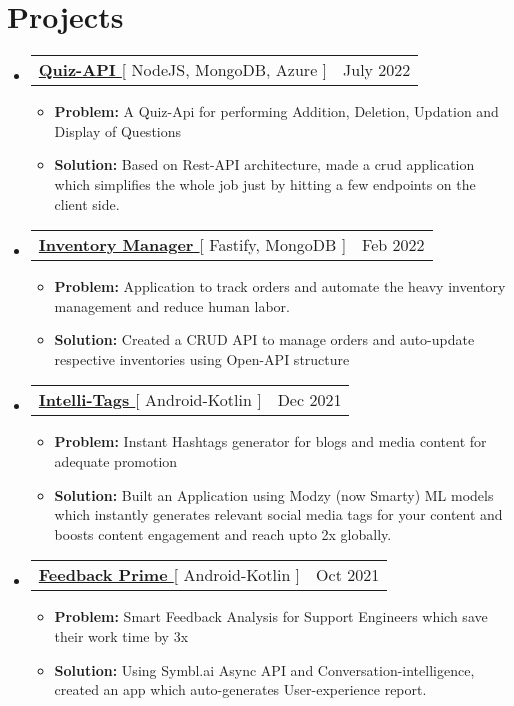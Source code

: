 \documentclass[letterpaper,11pt]{article}
\makeatletter
\newcommand{\resumeItem}[1]{
  \item\small{
    {#1 \vspace{-2pt}}
  }
}
\newcommand{\resumeProjectHeading}[2]{
    \item
    \begin{tabular*}{0.97\textwidth}{l@{\extracolsep{\fill}}r}
      \small#1 & #2 \\
    \end{tabular*}\vspace{-7pt}
}
\newcommand{\resumeSubHeadingListStart}{\begin{itemize}[leftmargin=0.15in, label={}]}
\newcommand{\resumeSubHeadingListEnd}{\end{itemize}}
\newcommand{\resumeItemListStart}{\begin{itemize}}
\newcommand{\resumeItemListEnd}{\end{itemize}\vspace{-5pt}}
\makeatother
\begin{document}
\section{Projects}

 \resumeSubHeadingListStart
      \resumeProjectHeading
          {\textbf{\href{https://github.com/aniketk13/quiz-api}{Quiz-API }}{[ NodeJS, MongoDB, Azure ]}}{July 2022}
          \resumeItemListStart
          \resumeItem{\textbf{Problem:} A Quiz-Api for performing Addition, Deletion, Updation and Display of Questions}
          \resumeItem{\textbf{Solution:} Based on Rest-API architecture, made a crud application which simplifies the whole job just by hitting a few endpoints on the client side.}
          \resumeItemListEnd
    \resumeSubHeadingListEnd
    
\resumeSubHeadingListStart
      \resumeProjectHeading
          {\textbf{\href{https://github.com/aniketk13/API-Fest}{Inventory Manager }}{[ Fastify, MongoDB ]}}{Feb 2022}
          \resumeItemListStart
          \resumeItem{\textbf{Problem:} Application to track orders and automate the heavy inventory management and reduce human labor.}
          \resumeItem{\textbf{Solution:} Created a CRUD API to manage orders and auto-update respective inventories using Open-API structure}
          \resumeItemListEnd
    \resumeSubHeadingListEnd
    
 \resumeSubHeadingListStart
      \resumeProjectHeading
          {\textbf{\href{https://github.com/aniketk13/Intelli-Tags}{Intelli-Tags }}{[ Android-Kotlin ]}}{Dec 2021}
          \resumeItemListStart
          \resumeItem{\textbf{Problem:} Instant Hashtags generator for blogs and media content for adequate promotion}
          \resumeItem{\textbf{Solution:} Built an Application using Modzy (now Smarty) ML models which instantly generates relevant social media tags for your content and boosts content engagement and reach upto 2x globally.}
          \resumeItemListEnd
    \resumeSubHeadingListEnd
    
    \resumeSubHeadingListStart
      \resumeProjectHeading
          {\textbf{\href{https://github.com/aniketk13/Feedback-Prime}{Feedback Prime }}{[ Android-Kotlin ]}}{Oct 2021}
          \resumeItemListStart
           \resumeItem{\textbf{Problem:} Smart Feedback Analysis for Support Engineers which save their work time by 3x}
           \resumeItem{\textbf{Solution:} Using Symbl.ai Async API and Conversation-intelligence, created an app which auto-generates User-experience report.}
          \resumeItemListEnd
    \resumeSubHeadingListEnd
    
\end{document}
